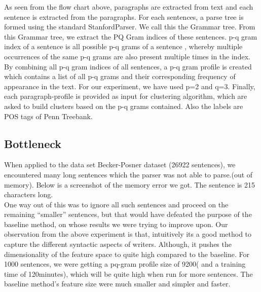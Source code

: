 \documentclass[letterpaper]{article}
\begin{document}
As seen from the flow chart above, paragraphs are extracted from text and each sentence is extracted from the paragraphs. For each sentences, a parse tree is formed using the standard StanfordParser. We call this the Grammar tree. From this Grammar tree, we extract the PQ Gram indices of these sentences. p-q gram index of a sentence is all possible p-q grams of a sentence , whereby multiple occurrences of the same p-q grams are also present multiple times in the index. By combining all p-q gram indices of all sentences, a p-q gram profile is created which contains a list of all p-q grams and their corresponding frequency of appearance in the text.
For our experiment, we have used p=2 and q=3. Finally, each paragraph-profile is provided as input for clustering algorithm, which are asked to build clusters based on the p-q grams contained. Also the labels are POS tags of Penn Treebank.


\subsection{Bottleneck}
When applied to the data set Becker-Posner dataset (26922 sentences), we encountered many long sentences which the parser was not able to parse.(out of memory). Below is a screenshot of the memory error we got. The sentence is 215 characters long.\\
One way out of this was to ignore all such sentences and proceed on the remaining “smaller” sentences, but that would have defeated the purpose of the baseline method, on whose results we were trying to improve upon.
Our observation from the above experiment is that, intuitively its a good method to capture the different syntactic aspects of writers. Although, it pushes the dimensionality of the feature space to quite high compared to the baseline. For 1000 sentences, we were getting a pq-gram profile size of 9200( and a training time of 120minutes), which will be quite high when run for more sentences. The baseline method’s feature size were much smaller and simpler and faster.
\end{document}
